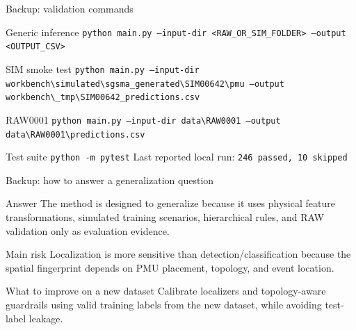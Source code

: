 \documentclass[10pt,aspectratio=169]{beamer}
\newcommand{\code}[1]{\texttt{\footnotesize #1}}
\newcommand{\smallcode}[1]{\texttt{\scriptsize #1}}
\begin{document}
\begin{frame}{Backup: validation commands}
\small
\begin{block}{Generic inference}
\code{python main.py --input-dir <RAW\_OR\_SIM\_FOLDER> --output <OUTPUT\_CSV>}
\end{block}
\begin{block}{SIM smoke test}
\smallcode{python main.py --input-dir workbench\textbackslash simulated\textbackslash sgsma\_generated\textbackslash SIM00642\textbackslash pmu --output workbench\textbackslash \_tmp\textbackslash SIM00642\_predictions.csv}
\end{block}
\begin{block}{RAW0001}
\code{python main.py --input-dir data\textbackslash RAW0001 --output data\textbackslash RAW0001\textbackslash predictions.csv}
\end{block}
\begin{exampleblock}{Test suite}
\code{python -m pytest} \quad Last reported local run: \code{246 passed, 10 skipped}
\end{exampleblock}
\end{frame}

\begin{frame}{Backup: how to answer a generalization question}
\small
\begin{block}{Answer}
The method is designed to generalize because it uses physical feature transformations, simulated training scenarios, hierarchical rules, and RAW validation only as evaluation evidence.
\end{block}
\begin{alertblock}{Main risk}
Localization is more sensitive than detection/classification because the spatial fingerprint depends on PMU placement, topology, and event location.
\end{alertblock}
\begin{exampleblock}{What to improve on a new dataset}
Calibrate localizers and topology-aware guardrails using valid training labels from the new dataset, while avoiding test-label leakage.
\end{exampleblock}
\end{frame}
\end{document}

